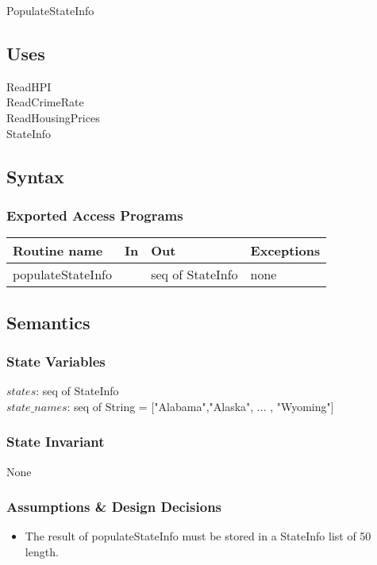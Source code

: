 \documentclass[12pt]{article}
\begin{document}
PopulateStateInfo

\subsection* {Uses}

ReadHPI\\
ReadCrimeRate\\
ReadHousingPrices\\
StateInfo

\subsection* {Syntax}

\subsubsection* {Exported Access Programs}

\begin{tabular}{| l | l | l | p{5cm} |}
\hline
\textbf{Routine name} & \textbf{In} & \textbf{Out} & \textbf{Exceptions}\\
\hline
populateStateInfo & & seq of StateInfo & none\\
\hline
\end{tabular}

\subsection* {Semantics}

\subsubsection* {State Variables}

$states$: seq of StateInfo\\
$state\_names$: seq of String = ["Alabama","Alaska", ... , "Wyoming"]

\subsubsection* {State Invariant}

None

\subsubsection* {Assumptions \& Design Decisions}

\begin{itemize}
\item The result of populateStateInfo must be stored in a StateInfo list of 50 length.
\end{itemize}
\end{document}
